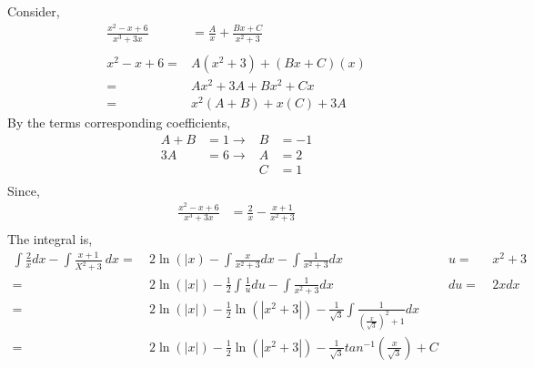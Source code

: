 \documentclass[10pt,letterpaper,cm]{hmcpset}
\begin{document}
Consider,\\
\begin{align*}
  \frac{x^2 - x + 6}{x^3+3x} &= \frac{A}{x} + \frac{Bx+C}{x^2+3}\\
  \\x^2-x+6=&A(x^2+3)+(Bx+C)(x)\\
           =&Ax^2+3A+Bx^2+Cx\\
           =&x^2(A+B)+x(C) + 3A
\end{align*}
By the terms corresponding coefficients,
\begin{align*}
          A+B &= 1 \rightarrow& B&=-1\\
          3A  &=6 \rightarrow& A&=2\\  
           && C &=1\\
\end{align*}
Since,
\begin{align*}
  \frac{x^2 - x + 6}{x^3+3x} &= \frac{2}{x} - \frac{x+1}{x^2+3}\\
\end{align*}
The integral is,
\begin{align*}
  \int\frac{2}{x}dx - \int\frac{x+1}{X^2+3}~dx =&~2\ln(|x) - \int\frac{x}{x^2+3}dx
  - \int\frac{1}{x^2+3}dx &u=&~x^2+3 \\
  =&~2\ln\left( |x| \right)-\frac{1}{2}\int\frac{1}{u}du
  - \int\frac{1}{x^2+3}dx &du=&~2xdx \\
  =&~2\ln\left( |x| \right)-\frac{1}{2} \ln(|x^2+3|)
  - \frac{1}{\sqrt{3}}\int\frac{1}{\left( \frac{x}{\sqrt{3}} \right)^2+1} dx \\
  =&~2\ln\left( |x| \right)-\frac{1}{2} \ln(|x^2+3|)
  - \frac{1}{\sqrt{3}}tan^{-1}\left( \frac{x}{\sqrt{3}}\right) + C \\
\end{align*}
\end{document}
